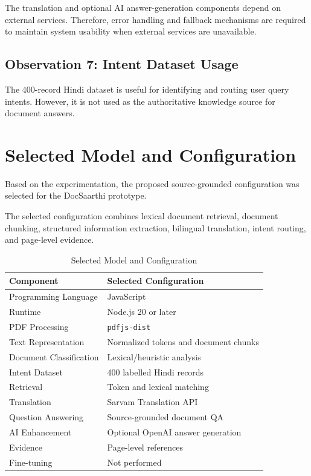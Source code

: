 The translation and optional AI answer-generation components depend on
external services. Therefore, error handling and fallback mechanisms
are required to maintain system usability when external services are
unavailable.

\subsection{Observation 7: Intent Dataset Usage}

The 400-record Hindi dataset is useful for identifying and routing
user query intents. However, it is not used as the authoritative
knowledge source for document answers.

\section{Selected Model and Configuration}

Based on the experimentation, the proposed source-grounded
configuration was selected for the DocSaarthi prototype.

The selected configuration combines lexical document retrieval,
document chunking, structured information extraction, bilingual
translation, intent routing, and page-level evidence.

\begin{table}[H]
\centering
\caption{Selected Model and Configuration}
\begin{tabular}{|p{5cm}|p{8cm}|}
\hline
\textbf{Component} & \textbf{Selected Configuration} \\
\hline
Programming Language & JavaScript \\
\hline
Runtime & Node.js 20 or later \\
\hline
PDF Processing & \texttt{pdfjs-dist} \\
\hline
Text Representation & Normalized tokens and document chunks \\
\hline
Document Classification & Lexical/heuristic analysis \\
\hline
Intent Dataset & 400 labelled Hindi records \\
\hline
Retrieval & Token and lexical matching \\
\hline
Translation & Sarvam Translation API \\
\hline
Question Answering & Source-grounded document QA \\
\hline
AI Enhancement & Optional OpenAI answer generation \\
\hline
Evidence & Page-level references \\
\hline
Fine-tuning & Not performed \\
\hline
\end{tabular}
\end{table}

